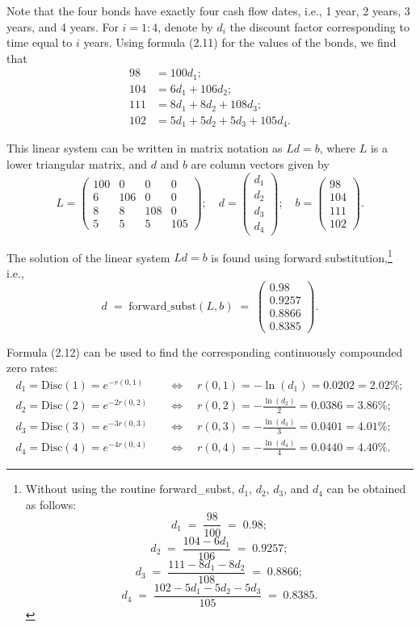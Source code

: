 \begin{examplex}
Note that the four bonds have exactly four cash flow dates, i.e., 1 year, 2 years, 3
years, and 4 years. For $i=1:4$, denote by $d_i$ the discount factor corresponding to
time equal to $i$ years. Using formula (2.11) for the values of the bonds, we find
that
\begin{align*}
98 &= 100d_1; \\
104 &= 6d_1 + 106d_2; \\
111 &= 8d_1 + 8d_2 + 108d_3; \\
102 &= 5d_1 + 5d_2 + 5d_3 + 105d_4.
\end{align*}

This linear system can be written in matrix notation as $Ld = b$, where $L$ is a
lower triangular matrix, and $d$ and $b$ are column vectors given by
\[
L = \begin{pmatrix} 100 & 0 & 0 & 0 \\ 6 & 106 & 0 & 0 \\ 8 & 8 & 108 & 0 \\
5 & 5 & 5 & 105 \end{pmatrix}; \quad
d = \begin{pmatrix} d_1 \\ d_2 \\ d_3 \\ d_4 \end{pmatrix}; \quad
b = \begin{pmatrix} 98 \\ 104 \\ 111 \\ 102 \end{pmatrix}.
\]

The solution of the linear system $Ld = b$ is found using forward
substitution,\footnote{Without using the routine forward\_subst, $d_1$, $d_2$, $d_3$,
and $d_4$ can be obtained as follows:
\[
d_1 \;=\; \frac{98}{100} \;=\; 0.98;
\]
\[
d_2 \;=\; \frac{104 - 6d_1}{106} \;=\; 0.9257;
\]
\[
d_3 \;=\; \frac{111 - 8d_1 - 8d_2}{108} \;=\; 0.8866;
\]
\[
d_4 \;=\; \frac{102 - 5d_1 - 5d_2 - 5d_3}{105} \;=\; 0.8385.
\]} i.e.,
\[
d \;=\; \text{forward\_subst}(L,b) \;=\; \begin{pmatrix} 0.98 \\ 0.9257 \\ 0.8866 \\
0.8385 \end{pmatrix}.
\]

Formula (2.12) can be used to find the corresponding continuously compounded zero
rates:
\begin{align*}
d_1 = \text{Disc}(1) = e^{-r(0,1)} \quad &\Longleftrightarrow \quad r(0,1) =
-\ln(d_1) = 0.0202 = 2.02\%; \\
d_2 = \text{Disc}(2) = e^{-2r(0,2)} \quad &\Longleftrightarrow \quad r(0,2) =
-\frac{\ln(d_2)}{2} = 0.0386 = 3.86\%; \\
d_3 = \text{Disc}(3) = e^{-3r(0,3)} \quad &\Longleftrightarrow \quad r(0,3) =
-\frac{\ln(d_3)}{3} = 0.0401 = 4.01\%; \\
d_4 = \text{Disc}(4) = e^{-4r(0,4)} \quad &\Longleftrightarrow \quad r(0,4) =
-\frac{\ln(d_4)}{4} = 0.0440 = 4.40\%.
\end{align*}
\end{examplex}
